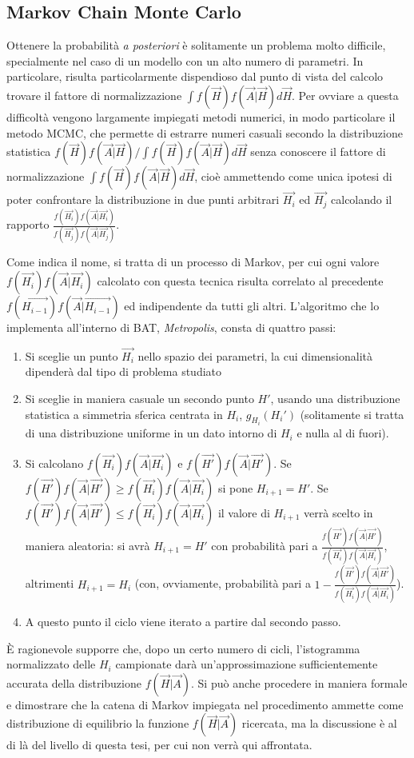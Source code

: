 \subsection{Markov Chain Monte Carlo}
\noindent
Ottenere la probabilità \emph{a posteriori} è solitamente un problema molto difficile, specialmente nel caso di un modello con un alto numero di parametri.
In particolare, risulta particolarmente dispendioso dal punto di vista del calcolo trovare il fattore di normalizzazione $\int f(\vec{H})f(\vec{A}|\vec{H})d\vec{H}$.
Per ovviare a questa difficoltà vengono largamente impiegati metodi numerici, in modo particolare il metodo MCMC, che permette di estrarre numeri casuali secondo 
la distribuzione statistica $f(\vec{H})f(\vec{A}|\vec{H})/\int f(\vec{H})f(\vec{A}|\vec{H})d\vec{H}$ senza conoscere il fattore di 
normalizzazione $\int f(\vec{H})f(\vec{A}|\vec{H})d\vec{H}$, cioè ammettendo come unica ipotesi di poter confrontare la distribuzione in due punti arbitrari 
$\vec{H_i}$ ed $\vec{H_j}$ calcolando il rapporto $\frac{f(\vec{H_i})f(\vec{A}|\vec{H_i})}{f(\vec{H_j})f(\vec{A}|\vec{H_j})}$.
 
Come indica il nome, si tratta di un processo di Markov, per cui ogni valore $f(\vec{H_i})f(\vec{A}|\vec{H_i})$ calcolato con questa tecnica risulta correlato 
al precedente $f(\vec{H_{i-1}})f(\vec{A}|\vec{H_{i-1}})$ ed indipendente da tutti gli altri.
L'algoritmo che lo implementa all'interno di BAT, \emph{Metropolis}, consta di quattro passi:
\begin{enumerate}
 \item Si sceglie un punto $\vec{H_i}$ nello spazio dei parametri, la cui dimensionalità dipenderà dal tipo di problema studiato
 \item Si sceglie in maniera casuale un secondo punto $H'$, usando una distribuzione statistica a simmetria sferica centrata in $H_i$, 
       $g_{H_i}(H_i')$ (solitamente si tratta di una distribuzione uniforme in un dato intorno di $H_i$ e nulla al di fuori).
 \item Si calcolano $f(\vec{H_i})f(\vec{A}|\vec{H_i})$ e $f(\vec{H'})f(\vec{A}|\vec{H'})$.
       Se $f(\vec{H'})f(\vec{A}|\vec{H'}) \geq f(\vec{H_i})f(\vec{A}|\vec{H_i})$ si pone $H_{i+1} = H'$. 
       Se $f(\vec{H'})f(\vec{A}|\vec{H'}) \leq f(\vec{H_i})f(\vec{A}|\vec{H_i})$ il valore di $H_{i+1}$ verrà scelto in maniera aleatoria:
       si avrà $H_{i+1} = H'$ con probabilità pari a $\frac{f(\vec{H'})f(\vec{A}|\vec{H'})}{f(\vec{H_i})f(\vec{A}|\vec{H_i})}$, altrimenti $H_{i+1} = H_i$ (con, ovviamente, probabilità pari a $1-\frac{f(\vec{H'})f(\vec{A}|\vec{H'})}{f(\vec{H_i})f(\vec{A}|\vec{H_i})}$).
 \item A questo punto il ciclo viene iterato a partire dal secondo passo.
\end{enumerate}
È ragionevole supporre che, dopo un certo numero di cicli, l'istogramma normalizzato delle $H_i$ campionate darà un'approssimazione sufficientemente accurata della 
distribuzione $f(\vec{H}|\vec{A})$. Si può anche procedere in maniera formale e dimostrare che la catena di Markov impiegata nel procedimento ammette come 
distribuzione di equilibrio la funzione $f(\vec{H}|\vec{A})$ ricercata, ma la discussione è al di là del livello di questa tesi, per cui non verrà qui affrontata.

